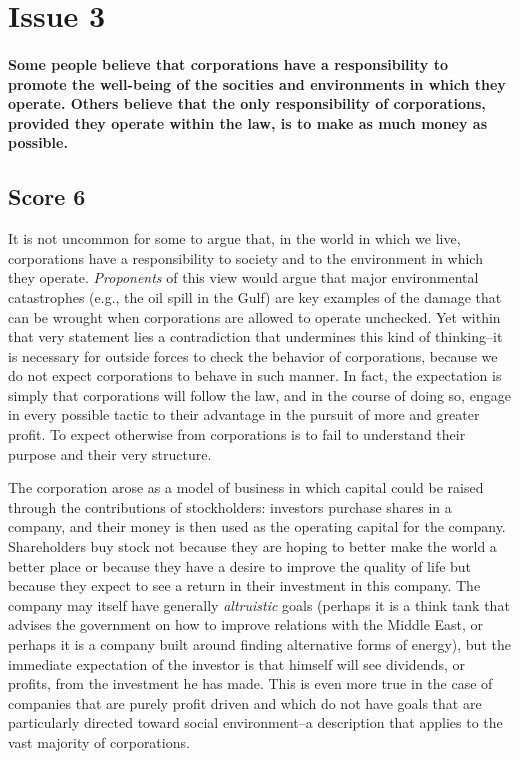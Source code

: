 \section{Issue 3}

\paragraph{Some people believe that corporations have a responsibility to promote the well-being of the socities and environments in which they operate.
Others believe that the only responsibility of corporations, provided they operate within the law, is to make as much money as possible.}

\subsection{Score 6}
It is not uncommon for some to argue that, in the world in which we live, corporations have a responsibility to society and to the environment in which they operate.
\emph{Proponents} of this view would argue that major environmental catastrophes (e.g., the oil spill in the Gulf) are key examples of the damage that can be wrought when corporations are allowed to operate unchecked.
Yet within that very statement lies a contradiction that undermines this kind of thinking--it is necessary for outside forces to check the behavior of corporations, because we do not expect corporations to behave in such manner.
In fact, the expectation is simply that corporations will follow the law, and in the course of doing so, engage in every possible tactic to their advantage in the pursuit of more and greater profit.
To expect otherwise from corporations is to fail to understand their purpose and their very structure.

The corporation arose as a model of business in which capital could be raised through the contributions of stockholders: investors purchase shares in a company, and their money is then used as the operating capital for the company.
Shareholders buy stock not because they are hoping to better make the world a better place or because they have a desire to improve the quality of life but because they expect to see a return in their investment in this company.
The company may itself have generally \emph{altruistic} goals (perhaps it is a think tank that advises the government on how to improve relations with the Middle East, or perhaps it is a company built around finding alternative forms of energy), but the immediate expectation of the investor is that himself will see dividends, or profits, from the investment he has made.
This is even more true in the case of companies that are purely profit driven and which do not have goals that are particularly directed toward social environment--a description that applies to the vast majority of corporations.

